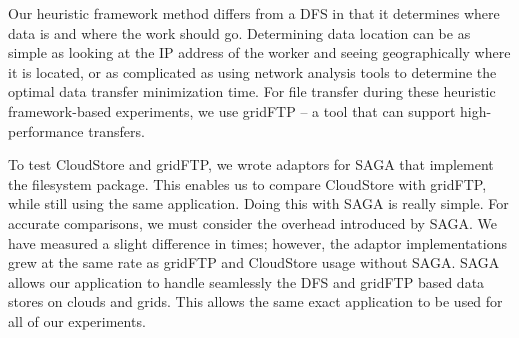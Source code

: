 \documentclass{rspublic}
\begin{document}
Our heuristic framework method differs from a DFS in that it
determines where data is and where the work should go. Determining
data location can be as simple as looking at the IP address of the
worker and seeing geographically where it is located, or as
complicated as using network analysis tools to determine the optimal
data transfer minimization time. For file transfer during these
heuristic framework-based experiments, we use gridFTP -- a tool that can
support high-performance transfers.

To test CloudStore and gridFTP, we wrote adaptors for SAGA that
implement the filesystem package. This enables us to compare CloudStore
with gridFTP, while still using the same application. Doing this with
SAGA is really simple. For accurate comparisons, we must consider the
overhead introduced by SAGA. We have measured a slight difference in
times; however, the adaptor implementations grew at the same rate as
gridFTP and CloudStore usage without SAGA.  SAGA allows our application
to handle seamlessly the DFS and gridFTP based data stores on clouds and
grids.  This allows the same exact application to be used for all of our
experiments.


\vspace{-0.3cm}
\end{document}
